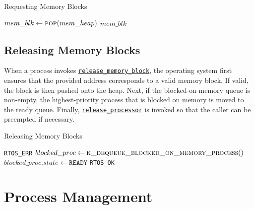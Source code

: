 \documentclass[12pt]{report}
\begin{document}
\begin{algorithm}
\caption{Requesting Memory Blocks}
\label{alg:requestingmemoryblocks}
\begin{algorithmic}[1]
        \State {}
        \State {}
    \EndWhile
    \State $mem\_blk \leftarrow \Call{pop}{mem\_heap}$
    \State \Return $mem\_blk$
\EndProcedure
\end{algorithmic}
\end{algorithm}

\subsection{Releasing Memory Blocks}

When a process invokes \hyperref[alg:releasingmemoryblocks]{\texttt{release_memory_block}}, the operating system first ensures that the provided address corresponds to a valid memory block. If valid, the block is then pushed onto the heap. Next, if the blocked-on-memory queue is non-empty, the highest-priority process that is blocked on memory is moved to the ready queue. Finally, \hyperref[alg:releasingtheprocessor]{\texttt{release_processor}} is invoked so that the caller can be preempted if necessary.\\

\begin{algorithm}
\caption{Releasing Memory Blocks}
\label{alg:releasingmemoryblocks}
\begin{algorithmic}[1]
        \State \Return \texttt{RTOS_ERR}
    \EndIf
    \State {}
        \State $blocked\_proc \leftarrow \Call{k\_dequeue\_blocked\_on\_memory\_process}{\null}$
        \State $blocked\_proc.state \leftarrow \texttt{READY}$
        \State {}
        \State {}
    \EndIf
    \State \Return \texttt{RTOS_OK}
\EndProcedure
\end{algorithmic}
\end{algorithm}

\section{Process Management}
\end{document}
